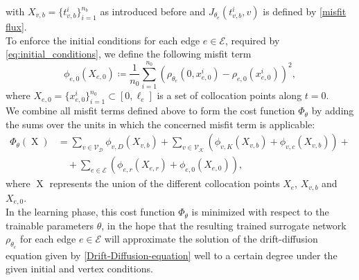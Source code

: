with $X_{v,b} = \{t_{v,b}^i\}_{i=1}^{n_b}$ as introduced before and $J_{\theta_e}\left( t_{v,b}^i, v \right)$ is defined by \cref{misfit flux}. \\
To enforce the initial conditions for each edge $e \in \mathcal{E}$, required by \cref{eq:initial_conditions}, we define the following misfit term  
\begin{equation} 
    \label{misfit:initial}
    \phi_{e,0}  \left( X_{e,0} \right) \coloneqq \frac{1}{n_0} \sum_{i=1}^{n_0}  \left( \rho_{\theta_e}  \left( 0,x_{e,0}^i \right) - \rho_{e,0} \left( x_{e,0}^i \right) \right)^2, 
\end{equation} 
where $X_{e,0} = \{x_{e,0}^i\}_{i=1}^{n_0} \subset \left[0, \ell_e\right]$ is a set of collocation points along $t=0$. \\ 
We combine all misfit terms defined above to form the cost function $\Phi_\theta$ by adding the sums over the units in which the concerned misfit term is applicable:
\begin{equation}
    \label{eq:loss:1}
    \begin{aligned} 
        \Phi_{\theta} \left( \operatorname{X} \right) & = \sum_{v \in \mathcal{V}_\mathcal{D}} \phi_{v,D} \left( X_{v,b} \right) + \sum_{v \in \mathcal{V}_\mathcal{K}}  \left(  \phi_{v,K}  \left( X_{v,b} \right) + \phi_{v,c} \left( X_{v,b} \right)  \right) + \\
        & \quad + \sum_{e \in \mathcal{E}}  \left(  \phi_{e,r}  \left( X_{e,r} \right) + \phi_{e,0}  \left( X_{e,0} \right)  \right), 
    \end{aligned}
\end{equation}
where $\operatorname{X}$ represents the union of the different collocation points $X_e$, $X_{v,b}$ and $X_{e,0}$. \\
In the learning phase, this cost function $\Phi_{\theta}$ is minimized with respect to the trainable parameters $\theta$, in the hope that the resulting trained surrogate network $\rho_{\theta_e}$ for each edge $e \in \mathcal{E}$ will approximate the solution of the drift-diffusion equation given by \cref{Drift-Diffusion-equation} well to a certain degree under the given initial and vertex conditions. \\

